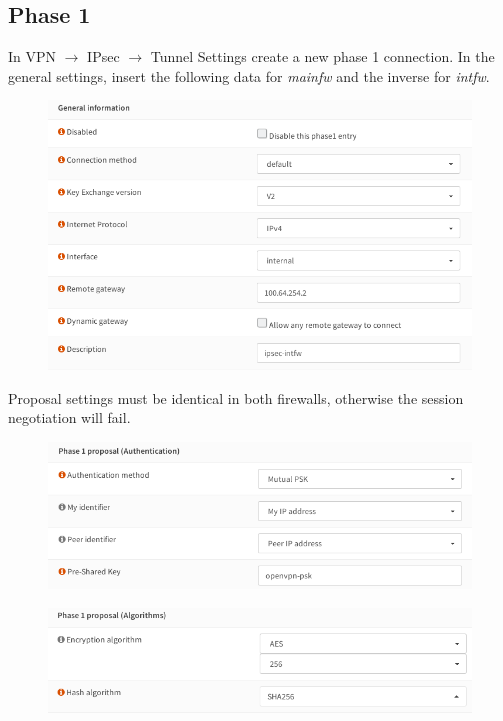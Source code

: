 \documentclass{homework}
\newcommand{\intfw}{\textit{intfw}\xspace}
\newcommand{\mainfw}{\textit{mainfw}\xspace}
\begin{document}
    \subsection{Phase 1}
    In VPN $\rightarrow$ IPsec $\rightarrow$ Tunnel Settings create a new phase 1 connection.
    In the general settings, insert the following data for \mainfw and the inverse for \intfw.
    \begin{figure}[H]
        \centering
        \includegraphics[width=\linewidth]{ipsec/phase1-general}
        \label{fig:ipsec-phase1-general}
    \end{figure}
    \vspace{-10pt}
%
    Proposal settings must be identical in both firewalls, otherwise the session negotiation will fail.
    \vspace{-5pt}
    \begin{figure}[H]
        \centering
        \includegraphics[width=\linewidth]{ipsec/phase1-proposal-auth}
        \label{fig:ipsec-phase1-proposal-auth}
    \end{figure}
    \begin{figure}[H]
        \centering
        \includegraphics[width=\linewidth]{ipsec/phase1-proposal-alg}
        \label{fig:ipsec-phase1-proposal-alg}
    \end{figure}
\end{document}
